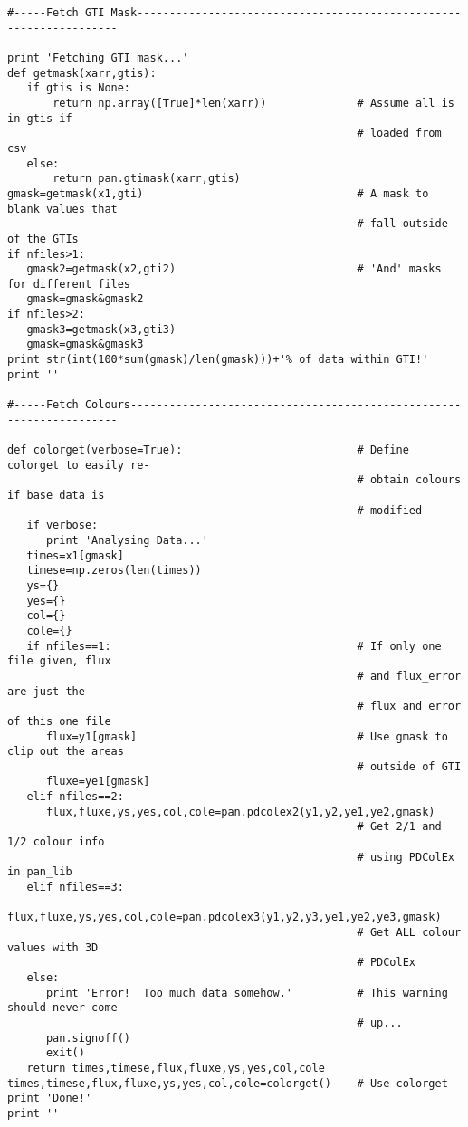\begin{verbatim}
#-----Fetch GTI Mask-------------------------------------------------------------------

print 'Fetching GTI mask...'
def getmask(xarr,gtis):
   if gtis is None:
       return np.array([True]*len(xarr))              # Assume all is in gtis if
                                                      # loaded from csv
   else:
       return pan.gtimask(xarr,gtis)
gmask=getmask(x1,gti)                                 # A mask to blank values that
                                                      # fall outside of the GTIs
if nfiles>1:
   gmask2=getmask(x2,gti2)                            # 'And' masks for different files
   gmask=gmask&gmask2
if nfiles>2:
   gmask3=getmask(x3,gti3)    
   gmask=gmask&gmask3
print str(int(100*sum(gmask)/len(gmask)))+'% of data within GTI!'
print ''

#-----Fetch Colours--------------------------------------------------------------------

def colorget(verbose=True):                           # Define colorget to easily re-
                                                      # obtain colours if base data is
                                                      # modified
   if verbose:
      print 'Analysing Data...'
   times=x1[gmask]
   timese=np.zeros(len(times))
   ys={}
   yes={}
   col={}
   cole={}
   if nfiles==1:                                      # If only one file given, flux
                                                      # and flux_error are just the
                                                      # flux and error of this one file
      flux=y1[gmask]                                  # Use gmask to clip out the areas
                                                      # outside of GTI
      fluxe=ye1[gmask]
   elif nfiles==2:
      flux,fluxe,ys,yes,col,cole=pan.pdcolex2(y1,y2,ye1,ye2,gmask)
                                                      # Get 2/1 and 1/2 colour info
                                                      # using PDColEx in pan_lib
   elif nfiles==3:
      flux,fluxe,ys,yes,col,cole=pan.pdcolex3(y1,y2,y3,ye1,ye2,ye3,gmask)
                                                      # Get ALL colour values with 3D
                                                      # PDColEx
   else:
      print 'Error!  Too much data somehow.'          # This warning should never come
                                                      # up...
      pan.signoff()
      exit()
   return times,timese,flux,fluxe,ys,yes,col,cole
times,timese,flux,fluxe,ys,yes,col,cole=colorget()    # Use colorget
print 'Done!'
print ''


\end{verbatim}
